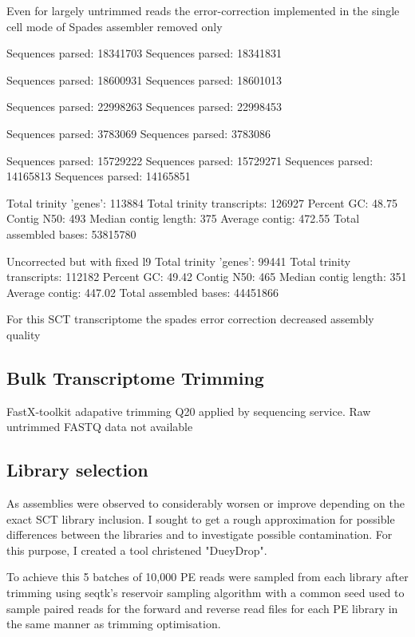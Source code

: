 Even for largely untrimmed reads the error-correction implemented in the single cell
mode of Spades assembler removed only 

Sequences parsed: 18341703
Sequences parsed: 18341831

Sequences parsed: 18600931
Sequences parsed: 18601013

Sequences parsed: 22998263
Sequences parsed: 22998453

Sequences parsed: 3783069
Sequences parsed: 3783086

Sequences parsed: 15729222
Sequences parsed: 15729271
Sequences parsed: 14165813
Sequences parsed: 14165851

Total trinity 'genes':  113884
Total trinity transcripts:      126927
Percent GC: 48.75
Contig N50: 493
Median contig length: 375
Average contig: 472.55
Total assembled bases: 53815780




Uncorrected but with fixed l9 
Total trinity 'genes':  99441
Total trinity transcripts:      112182
Percent GC: 49.42
Contig N50: 465
Median contig length: 351
Average contig: 447.02
Total assembled bases: 44451866

For this SCT transcriptome the spades error correction decreased assembly quality



\subsection{Bulk Transcriptome Trimming}

FastX-toolkit adapative trimming Q20 applied by sequencing service.
Raw untrimmed FASTQ data not available



\subsection{Library selection}
As assemblies were observed to considerably worsen or improve depending on the exact 
SCT library inclusion.  I sought to get a rough approximation for possible differences between
the libraries and to investigate possible contamination.  For this purpose, I created a tool
christened "DueyDrop".

To achieve this 5 batches of 10,000 PE reads were sampled from each library after trimming %
using seqtk's \citep{SeqtkGitHub} reservoir sampling algorithm with a common seed used to sample paired
reads for the forward and reverse read files for each PE library in the same manner as trimming optimisation.

